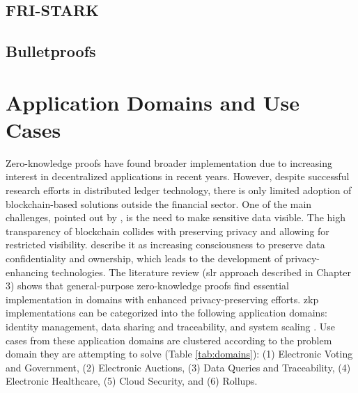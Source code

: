 \subsection{FRI-STARK}

\subsection{Bulletproofs}

\section{Application Domains and Use Cases}
Zero-knowledge proofs have found broader implementation due to increasing interest in decentralized applications in recent years. However, despite successful research efforts in distributed ledger technology, there is only limited adoption of blockchain-based solutions outside the financial sector. One of the main challenges, pointed out by \citet{SedlmeirTransparencyChallenge}, is the need to make sensitive data visible. The high transparency of blockchain collides with preserving privacy and allowing for restricted visibility. \citet{Godden} describe it as increasing consciousness to preserve data confidentiality and ownership, which leads to the development of privacy-enhancing technologies. The literature review (\acrshort{slr} approach described in Chapter 3) shows that general-purpose zero-knowledge proofs find essential implementation in domains with enhanced privacy-preserving efforts. \acrshort{zkp} implementations can be categorized into the following application domains: identity management, data sharing and traceability, and system scaling \citep{PipeZK, chen2022review, morais2019survey}. Use cases from these application domains are clustered according to the problem domain they are attempting to solve (Table \ref{tab:domains}): (1) Electronic Voting and Government, (2) Electronic Auctions, (3) Data Queries and Traceability, (4) Electronic Healthcare, (5) Cloud Security, and (6) Rollups.

